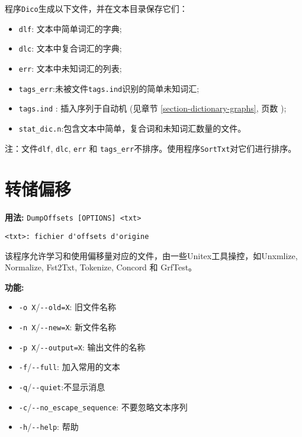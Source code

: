 \bigskip
\noindent 程序\verb+Dico+生成以下文件，并在文本目录保存它们：

\begin{itemize}
  \item \verb+dlf+: 文本中简单词汇的字典;
  \item \verb+dlc+: 文本中复合词汇的字典;
  \item \verb+err+: 文本中未知词汇的列表;
  \item \verb+tags_err+:未被文件\verb+tags.ind+识别的简单未知词汇;
  \item \verb+tags.ind+ : 插入序列于自动机
  (见章节 \ref{section-dictionary-graphs}, 页数 \pageref{section-dictionary-graphs});
  \item \verb+stat_dic.n+:包含文本中简单，复合词和未知词汇数量的文件。 
\end{itemize}

\bigskip
\noindent 注：文件\verb+dlf+, \verb+dlc+, \verb+err+ 和 \verb+tags_err+不排序。使用程序\verb+SortTxt+对它们进行排序。



\section{转储偏移}
\label{section-DumpOffsets}
\textbf{用法:} \verb+DumpOffsets [OPTIONS] <txt>+

\bigskip
\noindent\verb+<txt>: fichier d'offsets d'origine+

\bigskip
\noindent 该程序允许学习和使用偏移量对应的文件，由一些Unitex工具操控，如Unxmlize, Normalize, Fst2Txt, Tokenize, Concord 和 GrfTest。

\bigskip
\noindent \textbf{功能:}

\begin{itemize} 	 
  \item \verb+-o X+/\verb+--old=X+: 旧文件名称
  \item \verb+-n X+/\verb+--new=X+: 新文件名称 
  \item \verb+-p X+/\verb+--output=X+: 输出文件的名称
  \item \verb+-f+/\verb+--full+: 加入常用的文本
  \item \verb+-q+/\verb+--quiet+:不显示消息
  \item \verb+-c+/\verb+--no_escape_sequence+: 不要忽略文本序列
  \item \verb+-h+/\verb+--help+: 帮助 	 
\end{itemize}


